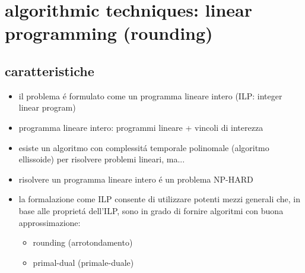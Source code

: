 \section*{algorithmic techniques: linear programming (rounding)}


\subsection*{caratteristiche}
\begin{flushleft}
	\begin{itemize}
		\item il problema \'e formulato come un programma lineare intero (ILP: integer linear program)
		\item programma lineare intero: programmi lineare + vincoli di interezza
		\item esiste un algoritmo con complessit\'a temporale polinomale (algoritmo ellissoide) per risolvere problemi lineari, ma...
		\item risolvere un programma lineare intero \'e un problema NP-HARD
		\item la formalazione come ILP consente di utilizzare potenti mezzi generali che, in base alle propriet\'a dell'ILP, sono in grado di fornire algoritmi con buona approssimazione:
		\begin{itemize}
			\item rounding (arrotondamento)
			\item primal-dual (primale-duale)
		\end{itemize}
	\end{itemize}
\end{flushleft}


